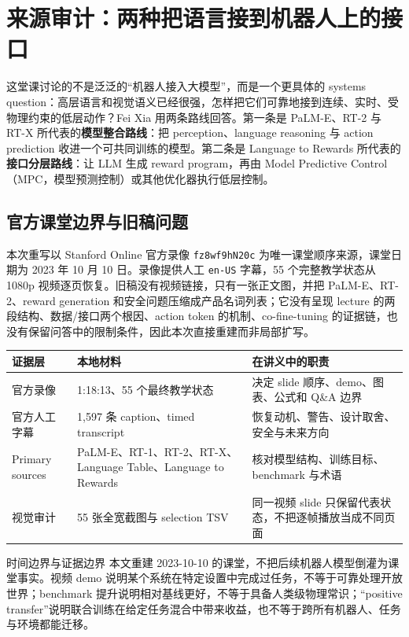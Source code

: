 \documentclass[a4paper]{article}
\begin{document}
\makecscover

\section{来源审计：两种把语言接到机器人上的接口}

这堂课讨论的不是泛泛的“机器人接入大模型”，而是一个更具体的 systems question：高层语言和视觉语义已经很强，怎样把它们可靠地接到连续、实时、受物理约束的低层动作？Fei Xia 用两条路线回答。第一条是 PaLM-E、RT-2 与 RT-X 所代表的\textbf{模型整合路线}：把 perception、language reasoning 与 action prediction 收进一个可共同训练的模型。第二条是 Language to Rewards 所代表的\textbf{接口分层路线}：让 LLM 生成 reward program，再由 Model Predictive Control（MPC，模型预测控制）或其他优化器执行低层控制。

\subsection{官方课堂边界与旧稿问题}

本次重写以 Stanford Online 官方录像 \texttt{fz8wf9hN20c} 为唯一课堂顺序来源，课堂日期为 2023 年 10 月 10 日。录像提供人工 \texttt{en-US} 字幕，55 个完整教学状态从 1080p 视频逐页恢复。旧稿没有视频链接，只有一张正文图，并把 PaLM-E、RT-2、reward generation 和安全问题压缩成产品名词列表；它没有呈现 lecture 的两段结构、数据/接口两个根因、action token 的机制、co-fine-tuning 的证据链，也没有保留问答中的限制条件，因此本次直接重建而非局部扩写。

\begin{longtable}{@{}L{0.18\textwidth}L{0.31\textwidth}L{0.39\textwidth}@{}}
\toprule
证据层 & 本地材料 & 在讲义中的职责 \\
\midrule
官方录像 & 1:18:13、55 个最终教学状态 & 决定 slide 顺序、demo、图表、公式和 Q\&A 边界 \\
官方人工字幕 & 1,597 条 caption、timed transcript & 恢复动机、警告、设计取舍、安全与未来方向 \\
Primary sources & PaLM-E、RT-1、RT-2、RT-X、Language Table、Language to Rewards & 核对模型结构、训练目标、benchmark 与术语 \\
视觉审计 & 55 张全宽截图与 selection TSV & 同一视频 slide 只保留代表状态，不把逐帧播放当成不同页面 \\
\bottomrule
\end{longtable}

\begin{warningbox}{时间边界与证据边界}
本文重建 2023-10-10 的课堂，不把后续机器人模型倒灌为课堂事实。视频 demo 说明某个系统在特定设置中完成过任务，不等于可靠处理开放世界；benchmark 提升说明相对基线更好，不等于具备人类级物理常识；“positive transfer”说明联合训练在给定任务混合中带来收益，也不等于跨所有机器人、任务与环境都能迁移。
\end{warningbox}
\end{document}

